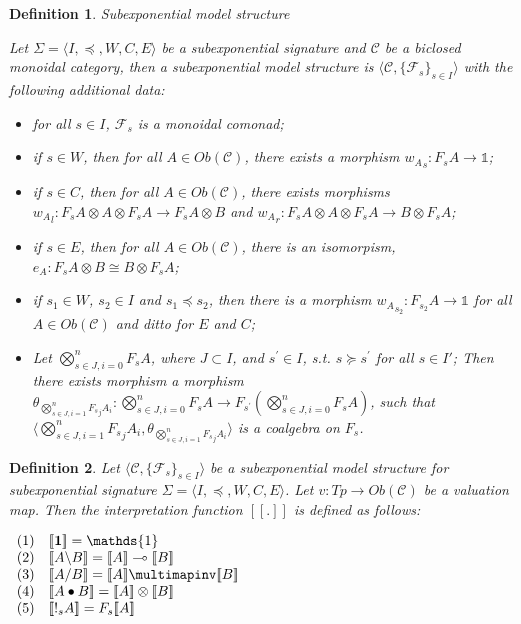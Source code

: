 \documentclass[a4paper]{article}
\newtheorem{defin}{Definition}
\begin{document}
\begin{defin} Subexponential model structure

  Let $\Sigma = \langle I, \preceq, W, C, E \rangle$ be a subexponential signature and $\mathcal{C}$ be a biclosed monoidal category,
  then a subexponential model structure is $\langle \mathcal{C}, \{ \mathcal{F}_{s} \}_{s \in I} \rangle$ with the following additional data:

\begin{itemize}
  \item for all $s \in I$, $\mathcal{F}_s$ is a monoidal comonad;
  \item if $s \in W$, then for all $A \in Ob(\mathcal{C})$, there exists a morphism ${w_{A}}_{s} : F_s A \to \mathds{1}$;
  \item if $s \in C$, then for all $A \in Ob(\mathcal{C})$, there exists morphisms
${w_{A}}_{l} : F_s A \otimes A \otimes F_s A \to F_s A \otimes B$ and ${w_{A}}_{r} : F_s A \otimes A \otimes F_s A \to B \otimes F_s A$;
  \item if $s \in E$, then for all $A \in Ob(\mathcal{C})$, there is an isomorpism, ${e_A} : F_s A \otimes B \cong B \otimes F_s A$;
  \item if $s_1 \in W$, $s_2 \in I$ and $s_1 \preceq s_2$, then there is a morphism ${w_{A}}_{s_2} : F_{s_2} A \to \mathds{1}$ for all $A \in Ob(\mathcal{C})$ and ditto for $E$ and $C$;
  \item Let $\bigotimes_{s \in J, i = 0}^{n} F_{s} A$, where $J \subset I$, and $s^{'} \in I$, s.t. $s \succeq s^{'}$ for all $s \in I'$;
  Then there exists morphism a morphism $\theta_{\bigotimes_{s \in J, i = 1}^{n} {F_{s}}_j A_i} : \bigotimes_{s \in J, i = 0}^{n} F_{s} A \to F_{s^{'}} (\bigotimes_{s \in J, i = 0}^{n} F_{s} A)$, such that
  $\langle \bigotimes_{s \in J, i = 1}^{n} {F_{s}}_j A_i, \theta_{\bigotimes_{s \in J, i = 1}^{n} {F_{s}}_j A_i} \rangle$ is a coalgebra on $F_s$.
\end{itemize}
\end{defin}

\begin{defin}
  Let $\langle \mathcal{C}, \{ \mathcal{F}_{s} \}_{s \in I} \rangle$ be a subexponential model structure
  for subexponential signature $\Sigma = \langle I, \preceq, W, C, E \rangle$.
  Let $v : Tp \to Ob(\mathcal{C})$ be a valuation map. Then the interpretation function $[\![.]\!]$ is defined as follows:

$\begin{array}{lll}
(1) &[\![{\bf 1}]\!] = \mathds{1}& \\
(2) &[\![A \backslash B]\!] = [\![A]\!] \multimap [\![B]\!]& \\
(3) &[\![A / B]\!] = [\![A]\!] \multimapinv [\![B]\!]& \\
(4) &[\![A \bullet B]\!] = [\![A]\!] \otimes [\![B]\!]&\\
(5) &[\![!_{s} A]\!] = F_s [\![A]\!]& \\
\end{array}$
\end{defin}
\end{document}
